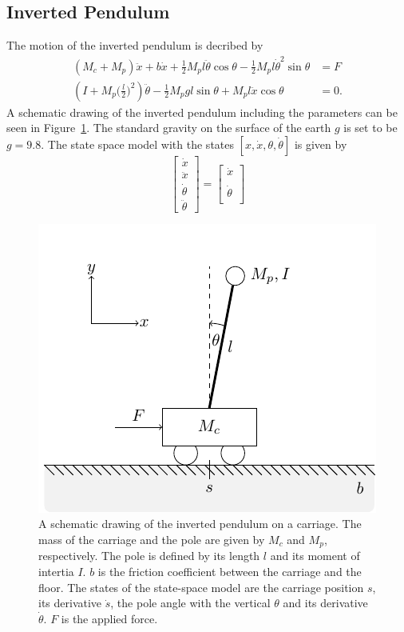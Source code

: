\documentclass[letterpaper, 10 pt, conference]{ieeeconf}  %
\begin{document}
\subsection{Inverted Pendulum}
The motion of the inverted pendulum is decribed by 
\begin{align}
(M_c +M_p)\ddot{x} + b\dot{x} +\frac{1}{2}M_p l \ddot{\theta} \cos{\theta}- \frac{1}{2}M_p l \dot{\theta}^2\sin{\theta} &=F\\
(I+M_p\Big(\frac{l}{2}\Big)^2)\ddot{\theta}-\frac{1}{2}M_p g l \sin{\theta} + M_p l \ddot{x} \cos{\theta}&= 0.
\end{align}
A schematic drawing of the inverted pendulum including the parameters can be seen in Figure~\ref{fig:inverted_pendulum}. The standard gravity on the surface of the earth $g$ is set to be $g=9.8$. The state space model with the states $[ x, \dot{x}, \theta, \dot{\theta}]$ is given by
\begin{equation}
\begin{bmatrix}
\dot{x}\\
\ddot{x}\\
\dot{\theta}\\
\ddot{\theta}
 \end{bmatrix}=
 \begin{bmatrix}
 \dot{x}\\
   \\
   \dot{\theta}
     \\
 \end{bmatrix}
\end{equation}
\begin{figure}
  \includegraphics[width=\linewidth]{tikz_inverted_pendulum.pdf}
  \caption{A schematic drawing of the inverted pendulum on a carriage. The mass of the carriage and the pole are given by $M_c$ and $M_p$, respectively. The pole is defined by its length $l$ and its moment of intertia $I$. $b$ is the friction coefficient between the carriage and the floor. The states of the state-space model are the carriage position $s$, its derivative $\dot{s}$, the pole angle with the vertical $\theta$ and its derivative $\dot{\theta}$. $F$ is the applied force. }
  \label{fig:inverted_pendulum}
\end{figure}
\end{document}
